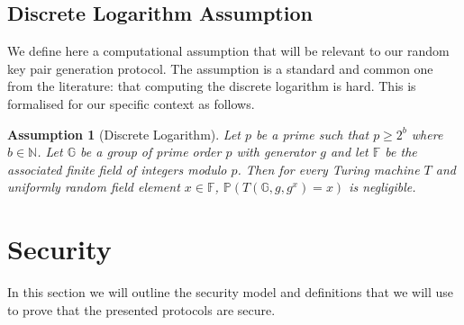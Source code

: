 \documentclass{article}
\newtheorem{assumption}{Assumption}
\theoremstyle{remark}
\newcommand{\N}{\mathbb{N}}
\newcommand{\F}{\mathbb{F}}
\newcommand{\G}{\mathbb{G}}
\renewcommand{\P}{\mathbb{P}}
\begin{document}
\subsection{Discrete Logarithm Assumption}

We define here a computational assumption that will be relevant to our random
key pair generation protocol. The assumption is a standard and common one from
the literature: that computing the discrete logarithm is hard. This is
formalised for our specific context as follows.

\begin{assumption}[Discrete Logarithm]\label{ass:dlog}
	Let $p$ be a prime such that $p \ge 2^b$ where $b \in \N$. Let $\G$ be a
	group of prime order $p$ with generator $g$ and let $\F$ be the associated
	finite field of integers modulo $p$. Then for every Turing machine $T$ and
	uniformly random field element $x \in \F$, $\P(T(\mathbb{G}, g, g^x) = x)$
	is negligible.
\end{assumption}

\section{Security}

\newcommand{\exec}[4]{\textup{\texttt{EXEC}}_{#1, #2} (#3, #4)}
\newcommand{\execD}{\exec{\proto}{\mathcal{A}}{x}{z}}

\newcommand{\ideal}[4]{\textup{\texttt{IDEAL}}_{#1, #2} (#3, #4)}
\newcommand{\idealD}{\ideal{\proto}{\mathcal{S}}{x}{z}}

In this section we will outline the security model and definitions that we will
use to prove that the presented protocols are secure.
\end{document}
